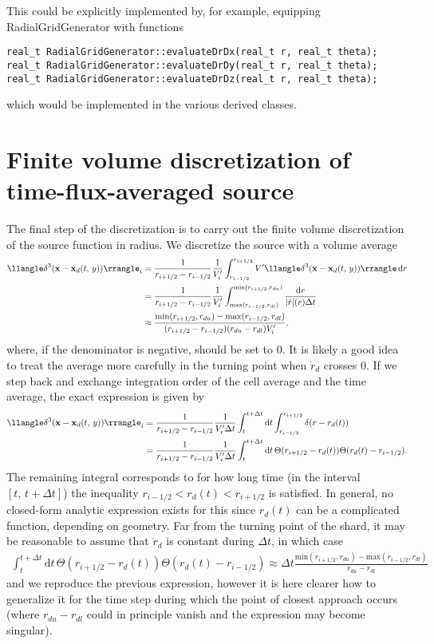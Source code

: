 \documentclass[11pt,a4paper]{article}
\newcommand{\rd}{\ensuremath{\mathrm{d}}}
\renewcommand{\b}[1]{\ensuremath{ {\bf #1 } }}
\begin{document}
This could be explicitly implemented by, for example, equipping RadialGridGenerator with functions
\begin{verbatim}
real_t RadialGridGenerator::evaluateDrDx(real_t r, real_t theta);
real_t RadialGridGenerator::evaluateDrDy(real_t r, real_t theta);
real_t RadialGridGenerator::evaluateDrDz(real_t r, real_t theta);
\end{verbatim}
which would be implemented in the various derived classes. 

\section*{Finite volume discretization of time-flux-averaged source}
The final step of the discretization is to carry out the finite volume discretization of the source function in radius. We discretize the source  with a volume average
\begin{align}
\llangle\delta^3( \b{x} - \b{x}_d(t,\,y)) \rrangle_i &= \frac{1}{r_{i+1/2} - r_{i-1/2}} \frac{1}{V'_i}\int_{r_{i-1/2}}^{r_{i+1/2}}V'\llangle\delta^3( \b{x} - \b{x}_d(t,\,y)) \rrangle  \, \rd r \nonumber \\
&= \frac{1}{r_{i+1/2} - r_{i-1/2}} \frac{1}{V'_i}\int_{\text{max}(r_{i-1/2},r_{dl})}^{\text{min}(r_{i+1/2},r_{du})}\frac{\rd r}{|\dot{r}|(r) \Delta t } \nonumber \\
&\approx \frac{\text{min}(r_{i+1/2},r_{du})-\text{max}(r_{i-1/2},r_{dl})}{(r_{i+1/2} - r_{i-1/2})(r_{du}-r_{dl})V'_i},
\end{align}
where, if the denominator is negative, should be set to 0.
It is likely a good idea to treat the average more carefully in the turning point when $\dot{r}_d$ crosses 0. If we step back and exchange integration order of the cell average and the time average, the exact expression is given by
\begin{align}
\llangle\delta^3( \b{x} - \b{x}_d(t,\,y)) \rrangle_i &= \frac{1}{r_{i+1/2} - r_{i-1/2}} \frac{1}{V'_i\Delta t}\int_t^{t+\Delta t}\rd t \int_{r_{i-1/2}}^{r_{i+1/2}}\delta(r-r_d(t)) \nonumber \\
&=\frac{1}{r_{i+1/2} - r_{i-1/2}} \frac{1}{V'_i\Delta t}\int_t^{t+\Delta t}\rd t \, \Theta(r_{i+1/2} - r_d(t)) \Theta(r_d(t)-r_{i-1/2}).
\end{align}
The remaining integral corresponds to for how long time (in the interval $[t,\,t+\Delta t]$) the inequality $r_{i-1/2} < r_d(t) < r_{i+1/2}$ is satisfied. In general, no closed-form analytic expression exists for this since $r_d(t)$ can be a complicated function, depending on geometry. Far from the turning point of the shard, it may be reasonable to assume that $\dot{r}_d$ is constant during $\Delta t$, in which case 
\begin{align}
\int_t^{t+\Delta t}\rd t \, \Theta(r_{i+1/2} - r_d(t)) \Theta(r_d(t)-r_{i-1/2}) \approx \Delta t \frac{\text{min}(r_{i+1/2},r_{du})-\text{max}(r_{i-1/2},r_{dl})}{r_{du}-r_{dl}}
\end{align}
and we reproduce the previous expression, however it is here clearer how to generalize it for the time step during which the point of closest approach occurs (where $r_{du}-r_{dl}$ could in principle vanish and the expression may become singular).
\end{document}
